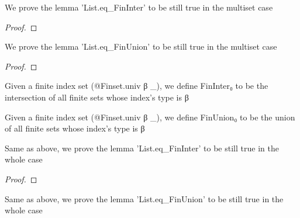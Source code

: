 \begin{lemma}\label{Multiset.eq_FinInter}
        \leanok
                We prove the lemma 'List.eq_FinInter' to be still true in the multiset case
    \end{lemma}

\begin{proof}
    \leanok
\end{proof}

\begin{lemma}\label{Multiset.eq_FinUnion}
        \leanok
                We prove the lemma 'List.eq_FinUnion' to be still true in the multiset case
    \end{lemma}

\begin{proof}
    \leanok
\end{proof}

\begin{definition}\label{FinInter₀}
        \leanok
                Given a finite index set (@Finset.univ β _), we define FinInter₀ to be the intersection of all finite sets whose index's type is β
    \end{definition}

\begin{definition}\label{FinUnion₀}
        \leanok
                Given a finite index set (@Finset.univ β _), we define FinUnion₀ to be the union of all finite sets whose index's type is β
    \end{definition}

\begin{lemma}\label{eq_FinInter₀}
        \leanok
                Same as above, we prove the lemma 'List.eq_FinInter' to be still true in the whole case
    \end{lemma}

\begin{proof}
    \leanok
\end{proof}

\begin{lemma}\label{eq_FinUnion₀}
        \leanok
                Same as above, we prove the lemma 'List.eq_FinUnion' to be still true in the whole case
    \end{lemma}

